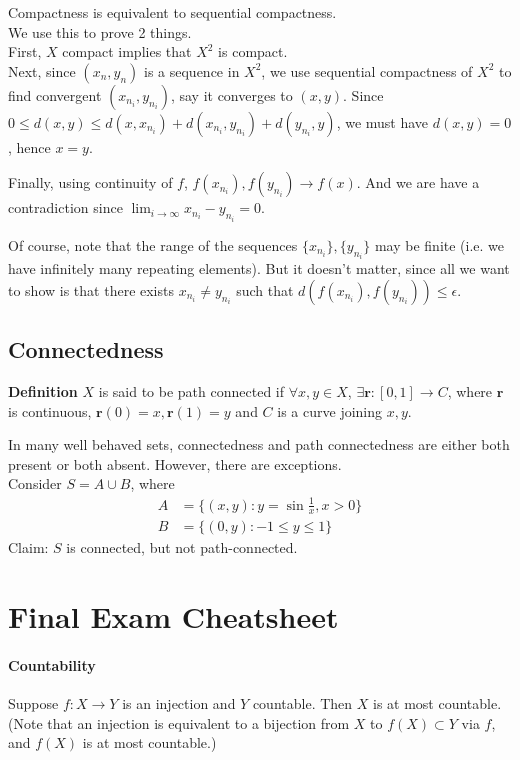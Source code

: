 \documentclass{article}
\begin{document}
Compactness is equivalent to sequential compactness.\\
We use this to prove 2 things.\\
First, $X$ compact implies that $X^2$ is compact.\\
Next, since $(x_n,y_n)$ is a sequence in $X^2$, we use sequential compactness of $X^2$ to find convergent $(x_{n_i},y_{n_i})$, say it converges to $(x,y)$. Since $0\leq d(x,y)\leq d(x,x_{n_i}) + d(x_{n_i}, y_{n_i}) + d(y_{n_i},y)$, we must have $d(x,y)=0$, hence $x=y$.

Finally, using continuity of $f$, $f(x_{n_i}), f(y_{n_i})\rightarrow f(x)$. And we are have a contradiction since $\lim_{i\rightarrow \infty}x_{n_i}-y_{n_i}=0$. 

Of course, note that the range of the sequences $\{x_{n_i}\}, \{y_{n_i}\}$ may be finite (i.e. we have infinitely many repeating elements). But it doesn't matter, since all we want to show is that there exists $x_{n_i}\neq y_{n_i}$ such that $d(f(x_{n_i}),f(y_{n_i}))\leq \epsilon$.

\subsection{Connectedness}
\textbf{Definition} $X$ is said to be path connected if $\forall x,y\in X$, $\exists \mathbf{r}:[0,1]\rightarrow C$, where $\mathbf{r}$ is continuous, $\mathbf{r}(0)=x,\mathbf{r}(1)=y$ and $C$ is a curve joining $x,y$.

In many well behaved sets, connectedness and path connectedness are either both present or both absent. However, there are exceptions.\\
Consider $S=A\cup B$, where
\begin{align*}
	A &= \{(x,y):y=\sin \frac{1}{x}, x>0\}\\
	B &= \{(0,y):-1\leq y\leq 1\}
\end{align*}
Claim: $S$ is connected, but not path-connected.

\section{Final Exam Cheatsheet}
\paragraph{Countability} Suppose $f:X\rightarrow Y$ is an injection and $Y$ countable. Then $X$ is at most countable. (Note that an injection is equivalent to a bijection from $X$ to $f(X)\subset Y$ via $f$, and $f(X)$ is at most countable.)
\end{document}
